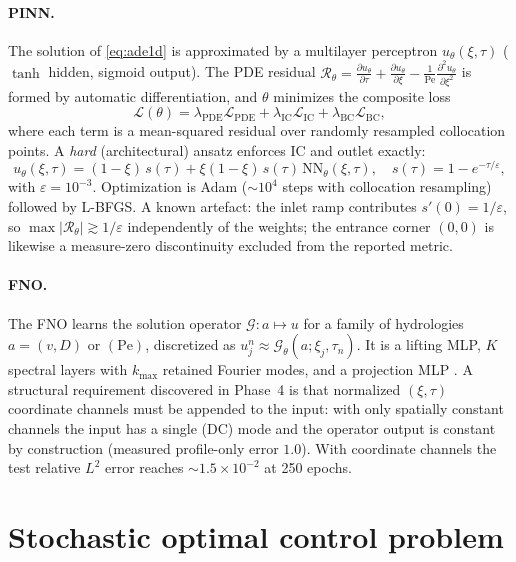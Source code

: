 \documentclass[10pt]{article}
\newcommand{\pdd}[2]{\frac{\partial #1}{\partial #2}}
\newcommand{\pddt}[2]{\frac{\partial^{2} #1}{\partial #2^{2}}}
\begin{document}
\paragraph{PINN.}
The solution of \eqref{eq:ade1d} is approximated by a multilayer perceptron
$u_\theta(\xi,\tau)$ ($\tanh$ hidden, sigmoid output). The PDE residual
$\mathcal{R}_\theta=\pdd{u_\theta}{\tau}+\pdd{u_\theta}{\xi}-\tfrac{1}{\mathrm{Pe}}\pddt{u_\theta}{\xi}$
is formed by automatic differentiation, and $\theta$ minimizes the composite
loss
\begin{equation}
\mathcal{L}(\theta)=\lambda_{\mathrm{PDE}}\mathcal{L}_{\mathrm{PDE}}
+\lambda_{\mathrm{IC}}\mathcal{L}_{\mathrm{IC}}
+\lambda_{\mathrm{BC}}\mathcal{L}_{\mathrm{BC}},
\label{eq:pinnloss}
\end{equation}
where each term is a mean-squared residual over randomly resampled collocation
points. A \emph{hard} (architectural) ansatz enforces IC and outlet exactly:
\begin{equation}
u_\theta(\xi,\tau)=(1-\xi)\,s(\tau)+\xi(1-\xi)\,s(\tau)\,\mathrm{NN}_\theta(\xi,\tau),
\quad s(\tau)=1-e^{-\tau/\varepsilon},
\label{eq:hardbc}
\end{equation}
with $\varepsilon=10^{-3}$. Optimization is Adam ($\sim\!10^4$ steps with
collocation resampling) followed by L-BFGS. A known artefact: the inlet ramp
contributes $s'(0)=1/\varepsilon$, so $\max|\mathcal{R}_\theta|\gtrsim 1/\varepsilon$
independently of the weights; the entrance corner $(0,0)$ is likewise a
measure-zero discontinuity excluded from the reported metric.

\paragraph{FNO.}
The FNO learns the solution operator $\mathcal{G}:a\mapsto u$ for a family of
hydrologies $a=(v,D)$ or $(\mathrm{Pe})$, discretized as
$u_j^n\approx\mathcal{G}_\theta(a;\xi_j,\tau_n)$. It is a lifting MLP, $K$
spectral layers with $k_{\max}$ retained Fourier modes, and a projection MLP
\cite{li2020fourier}. A structural requirement discovered in Phase~4 is that
normalized $(\xi,\tau)$ coordinate channels must be appended to the input:
with only spatially constant channels the input has a single (DC) mode and the
operator output is constant by construction (measured profile-only error
$1.0$). With coordinate channels the test relative $L^2$ error reaches
$\sim\!1.5\times10^{-2}$ at 250 epochs.

\section{Stochastic optimal control problem}
\label{sec:saa}
\end{document}
